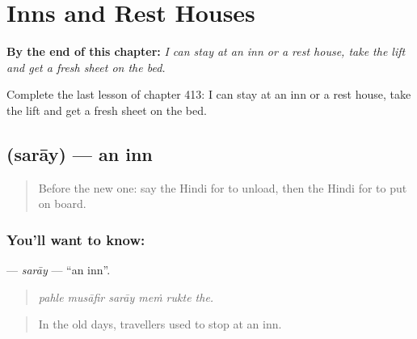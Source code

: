 
\chapter{Inns and Rest Houses}
\label{ch:hi-inns-and-rest-houses}

\begin{chapteropening}
\textbf{By the end of this chapter:} \emph{I can stay at an inn or a rest house, take the lift and get a fresh sheet on the bed.}

Complete the last lesson of chapter 413: I can stay at an inn or a rest house, take the lift and get a fresh sheet on the bed.
\end{chapteropening}

\section[\texorpdfstring{\hi{सराय} (sarāy)}{सराय (sarāy)}]{ (sarāy) — an inn}

\label{lesson:HI-C413-saray}



\begin{quote}
Before the new one: say the Hindi for to unload, then the Hindi for to put on board.
\end{quote}

\subsection*{You'll want to know: }
\textbf{} — \emph{sarāy} — \textquotedblleft{}an inn\textquotedblright{}.

\begin{quote}
     
\end{quote}

\begin{quote}
\emph{pahle musāfir sarāy meṁ rukte the.}
\end{quote}

\begin{quote}
In the old days, travellers used to stop at an inn.
\end{quote}

